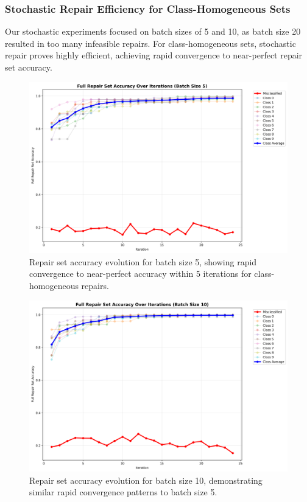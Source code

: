 \documentclass{article}
\begin{document}
\subsubsection{Stochastic Repair Efficiency for Class-Homogeneous Sets}

Our stochastic experiments focused on batch sizes of 5 and 10, as batch size 20 resulted in too many infeasible repairs. For class-homogeneous sets, stochastic repair proves highly efficient, achieving rapid convergence to near-perfect repair set accuracy.

\begin{figure}[h]
	\centering
	\includegraphics[width=\textwidth]{results/stochastic_analysis/batch_iterations/repair_accuracy_batch_5.png}
	\caption{Repair set accuracy evolution for batch size 5, showing rapid convergence to near-perfect accuracy within 5 iterations for class-homogeneous repairs.}
	\label{fig:repair_convergence_batch_5}
\end{figure}

\begin{figure}[h]
	\centering
	\includegraphics[width=\textwidth]{results/stochastic_analysis/batch_iterations/repair_accuracy_batch_10.png}
	\caption{Repair set accuracy evolution for batch size 10, demonstrating similar rapid convergence patterns to batch size 5.}
	\label{fig:repair_convergence_batch_10}
\end{figure}
\end{document}
